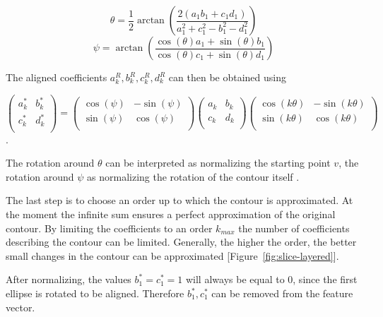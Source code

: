 $$
\theta = \frac{1}{2}\arctan \left( \frac{2(a_1b_1 + c_1d_1)}{a_1^2 + c_1^2 - b_1^2 - d_1^2} \right)
$$
$$
\psi = \arctan \left( \frac{\cos(\theta) a_1 + \sin(\theta) b_1 }{\cos(\theta) c_1 + \sin(\theta) d_1} \right)
$$

The aligned coefficients $a_k^R, b_k^R, c_k^R, d_k^R$ can then be obtained using

$$
\begin{pmatrix}
  a_k^* & b_k^* \\
  c_k^* & d_k^* \\
\end{pmatrix}
=
\begin{pmatrix}
  \cos(\psi) & -\sin(\psi) \\
  \sin(\psi) & \cos(\psi) \\
\end{pmatrix}
\begin{pmatrix}
  a_k & b_k \\
  c_k & d_k \\
\end{pmatrix}
\begin{pmatrix}
  \cos(k\theta ) & -\sin(k\theta) \\
  \sin(k\theta) & \cos(k\theta) \\
\end{pmatrix}
$$.

The rotation around $\theta $ can be interpreted as normalizing the starting point $v$, 
the rotation around $\psi$ as normalizing the rotation of the contour itself \cite{KUHL1982236}.

The last step is to choose an order up to which the contour is approximated.
At the moment the infinite sum ensures a perfect approximation of the original contour. 
By limiting the coefficients to an order $k_{max}$ the number of coefficients describing the contour can be limited.
Generally, the higher the order, the better small changes in the contour can be approximated [Figure~\ref{fig:slice-layered}].


After normalizing, the values $b_1^* = c_1^* = 1$ will always be equal to 0, since the first ellipse is rotated to be aligned.
Therefore $b_1^*, c_1^*$ can be removed from the feature vector.

